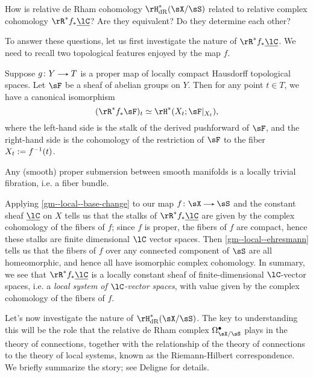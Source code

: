 \begin{question}
  \label{gm--local--derham-complex}
  How is relative de Rham cohomology $\rH^*_\dR(\sX/\sS)$ related to relative complex cohomology $\rR^*f_*\u\lC$? Are they equivalent? Do they determine each other?
\end{question}

To answer these questions, let us first investigate the nature of $\rR^*f_*\u\lC$. We need to recall two topological features enjoyed by the map $f$.

\begin{proposition}
  \label{gm--local--base-change}
  Suppose $g \c Y \to T$ is a proper map of locally compact Hausdorff topological spaces. Let $\sF$ be a sheaf of abelian groups on $Y$. Then for any point $t \in T$, we have a canonical isomorphism
  \[
    (\rR^*f_*\sF)_t \iso \rH^*(X_t; \sF|_{X_t}),
  \]
  where the left-hand side is the stalk of the derived pushforward of $\sF$, and the right-hand side is the cohomology of the restriction of $\sF$ to the fiber $X_t \mathrel{:=} f^{-1}(t)$.
\end{proposition}

\begin{proposition}[Ehresmann]
  \label{gm--local--ehresmann}
  Any (smooth) proper submersion between smooth manifolds is a locally trivial fibration, i.e. a fiber bundle.
\end{proposition}

\begin{nothing}
  \label{gm--local--relative-complex}
  Applying \cref{gm--local--base-change} to our map $f \c \sX \to \sS$ and the constant sheaf $\u\lC$ on $X$ tells us that the stalks of $\rR^*f_*\u\lC$ are given by the complex cohomology of the fibers of $f$; since $f$ is proper, the fibers of $f$ are compact, hence these stalks are finite dimensional $\lC$ vector spaces. Then \cref{gm--local--ehresmann} tells us that the fibers of $f$ over any connected component of $\sS$ are all homeomorphic, and hence all have isomorphic complex cohomology. In summary, we see that $\rR^*f_*\u\lC$ is a locally constant sheaf of finite-dimensional $\lC$-vector spaces, i.e. a \emph{local system of $\lC$-vector spaces}, with value given by the complex cohomology of the fibers of $f$.
\end{nothing}

Let's now investigate the nature of $\rH^*_\dR(\sX/\sS)$. The key to understanding this will be the role that the relative de Rham complex $\Omega_{\sX/\sS}^\bullet$ plays in the theory of connections, together with the relationship of the theory of connections to the theory of local systems, known as the Riemann-Hilbert correspondence. We briefly summarize the story; see Deligne for details.

